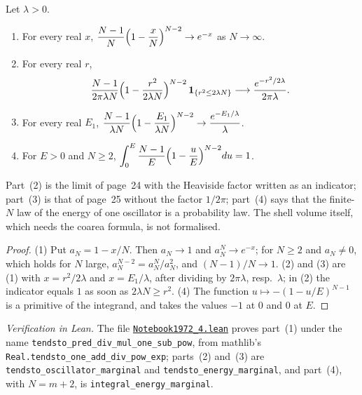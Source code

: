 \begin{encadre}
\begin{theoreme}\label{thm:quillen-1972-4}
Let $\lambda > 0$.
\begin{enumerate}
\item For every real $x$, $\dfrac{N-1}{N}\Bigl(1 - \dfrac xN\Bigr)^{N-2} \to e^{-x}$ as $N \to \infty$.
\item For every real $r$,
\[
\frac{N-1}{2\pi\lambda N}\Bigl(1 - \frac{r^2}{2\lambda N}\Bigr)^{N-2}\,\mathbf 1_{\{r^2 \le 2\lambda N\}} \longrightarrow \frac{e^{-r^2/2\lambda}}{2\pi\lambda}.
\]
\item For every real $E_1$, $\dfrac{N-1}{\lambda N}\Bigl(1 - \dfrac{E_1}{\lambda N}\Bigr)^{N-2} \to \dfrac{e^{-E_1/\lambda}}{\lambda}$.
\item For $E > 0$ and $N \ge 2$, $\displaystyle\int_0^E \frac{N-1}{E}\Bigl(1 - \frac uE\Bigr)^{N-2} du = 1$.
\end{enumerate}
\end{theoreme}
\end{encadre}

\noindent Part~(2) is the limit of page~24 with the Heaviside factor written as an indicator; part~(3) is that of page~25 without the factor $1/2\pi$; part~(4) says that the finite-$N$ law of the energy of one oscillator is a probability law. The shell volume itself, which needs the coarea formula, is not formalised.

\begin{proof}
(1) Put $a_N = 1 - x/N$. Then $a_N \to 1$ and $a_N^N \to e^{-x}$; for $N \ge 2$ and $a_N \ne 0$, which holds for $N$ large, $a_N^{N-2} = a_N^N / a_N^2$, and $(N-1)/N \to 1$. (2) and (3) are (1) with $x = r^2/2\lambda$ and $x = E_1/\lambda$, after dividing by $2\pi\lambda$, resp.\ $\lambda$; in (2) the indicator equals $1$ as soon as $2\lambda N \ge r^2$. (4) The function $u \mapsto -(1 - u/E)^{N-1}$ is a primitive of the integrand, and takes the values $-1$ at $0$ and $0$ at $E$.
\end{proof}

\emph{Verification in Lean.} The file \href{\leanblobmain/Notebook1972_4.lean}{\texttt{Notebook1972\_4.\allowbreak{}lean}} proves part~(1) under the name \texttt{tendsto\_pred\_div\_mul\_one\_sub\_pow}, from mathlib's \texttt{Real.tendsto\_one\_add\_div\_pow\_exp}; parts~(2) and~(3) are \texttt{tendsto\_oscillator\_marginal} and \texttt{tendsto\_energy\_marginal}, and part~(4), with $N = m + 2$, is \texttt{integral\_energy\_marginal}.

